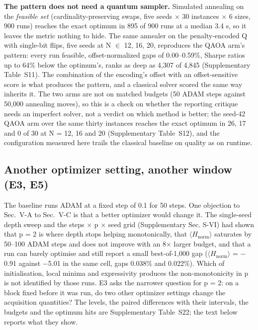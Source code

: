\documentclass{ieeeaccess}
\begin{document}
\textbf{The pattern does not need a quantum sampler.} Simulated annealing on the \textit{feasible set} (cardinality-preserving swaps, five seeds $\times$ 30 instances $\times$ 6 sizes, 900 runs) reaches the exact optimum in 895 of 900 runs at a median 3.4 s, so it leaves the metric nothing to hide. The same annealer on the penalty-encoded Q with single-bit flips, five seeds at N $\in$ {12, 16, 20}, reproduces the QAOA arm's pattern: every run feasible, offset-normalized gaps of 0.00--0.59\%, Sharpe ratios up to 64\% below the optimum's, ranks as deep as 4,307 of 4,845 (Supplementary Table~S11). The combination of the encoding's offset with an offset-sensitive score is what produces the pattern, and a classical solver scored the same way inherits it. The two arms are not on matched budgets (50 ADAM steps against 50,000 annealing moves), so this is a check on whether the reporting critique needs an imperfect solver, not a verdict on which method is better; the seed-42 QAOA arm over the same thirty instances reaches the exact optimum in 26, 17 and 0 of 30 at N = 12, 16 and 20 (Supplementary Table~S12), and the configuration measured here trails the classical baseline on quality as on runtime.


\subsection{Another optimizer setting, another window (E3, E5)}


The baseline runs ADAM at a fixed step of 0.1 for 50 steps. One objection to Sec.~V-A to Sec.~V-C is that a better optimizer would change it. The single-seed depth sweep and the steps $\times$ p $\times$ seed grid (Supplementary Sec. S-VI) had shown that p = 2 is where depth stops helping monotonically, that $\langle$$H_{\mathrm{norm}}$$\rangle$ saturates by 50--100 ADAM steps and does not improve with an 8$\times$ larger budget, and that a run can barely optimise and still report a small best-of-1,000 gap ($\langle$$H_{\mathrm{norm}}$$\rangle$ = $-$0.91 against $-$5.01 in the same cell, gaps 0.038\% and 0.022\%). Which of initialisation, local minima and expressivity produces the non-monotonicity in p is not identified by those runs. E3 asks the narrower question for p = 2: on a block fixed before it was run, do two other optimizer settings change the acquisition quantities? The levels, the paired differences with their intervals, the budgets and the optimum hits are Supplementary Table~S22; the text below reports what they show.
\end{document}
